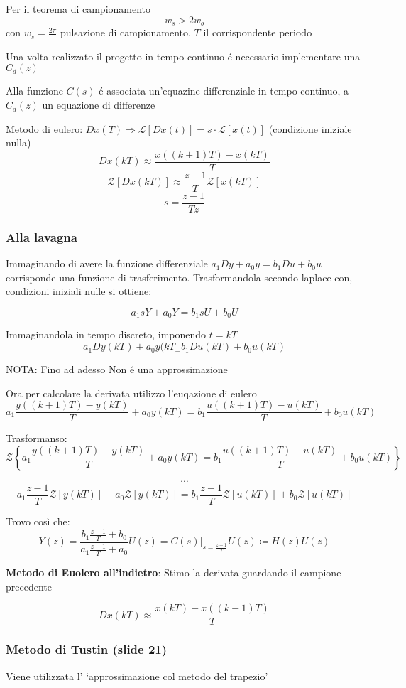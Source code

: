 \documentclass{article}
\begin{document}
Per il teorema di campionamento
\[ w_s > 2w_b \]
con $w_s = \frac{2\pi}{}$ pulsazione di campionamento, $T$ il corrispondente periodo

Una volta realizzato il progetto in tempo continuo \'e necessario implementare una $C_d(z)$

Alla funzione $C(s)$ \'e associata un'equazine differenziale in tempo continuo, a $C_d(z)$  un equazione di differenze

Metodo di eulero: $Dx(T) \Rightarrow \mathcal{L}[Dx(t)] = s\cdot\mathcal{L}[x(t)]$ (condizione iniziale nulla)
\[ Dx(kT) \approx \frac{x((k+1)T) - x(kT)}{T}\]
\[ \mathcal{Z}[Dx(kT)]  \approx \frac{z-1}{T}\mathcal{Z}[x(kT)]\]
\[ s = \frac{z-1}{Tz}\]

\subsubsection{Alla lavagna}

Immaginando di avere la funzione differenziale $a_1 Dy + a_0y = b_1Du + b_0u$ corrisponde una funzione di trasferimento.
Trasformandola secondo laplace con, condizioni iniziali nulle si ottiene:

\[ a_1 sY + a_0 Y = b_1 sU + b_0 U \]

Immaginandola in tempo discreto, imponendo $t = kT$
\[ a_1 Dy(kT) + a_0 y(kT_ = b_1 Du(kT) + b_0u(kT) \]

NOTA: Fino ad adesso Non \'e una approssimazione

Ora per calcolare la derivata utilizzo l'euqazione di eulero
\[ a_1 \frac{y((k+1)T) - y(kT)}{T} + a_0 y(kT) = b_1\frac{u((k+1)T) - u(kT)}{T} + b_0u(kT)\]

Trasformanso:
\[ \mathcal{Z}\left\{a_1 \frac{y((k+1)T) - y(kT)}{T} + a_0 y(kT) = b_1\frac{u((k+1)T) - u(kT)}{T} + b_0u(kT)\right\}\]

\[ \cdots\]
\[ a_1 \frac{z-1}{T} \mathcal{Z}[y(kT)] + a_0 \mathcal{Z}[y(kT)] = b_1 \frac{z-1}{T} \mathcal{Z}[u(kT)] + b_0 \mathcal{Z}[u(kT)]\]

Trovo cos\`i che:
\[ Y(z) = \frac{b_1\frac{z-1}{T} + b_0}{a_1\frac{z-1}{T} + a_0} U(z) = \left.C(s)\right|_{s=\frac{z-1}{T}} U(z) \coloneqq H(z)U(z)\]

\bigbreak

\textbf{Metodo di Euolero all'indietro}: Stimo la derivata guardando il campione precedente

\[ Dx(kT) \approx \frac{x(kT) - x((k-1)T)}{T}\]

\subsubsection{Metodo di Tustin (slide 21)}
Viene utilizzata l' `approssimazione col metodo del trapezio'
\end{document}
